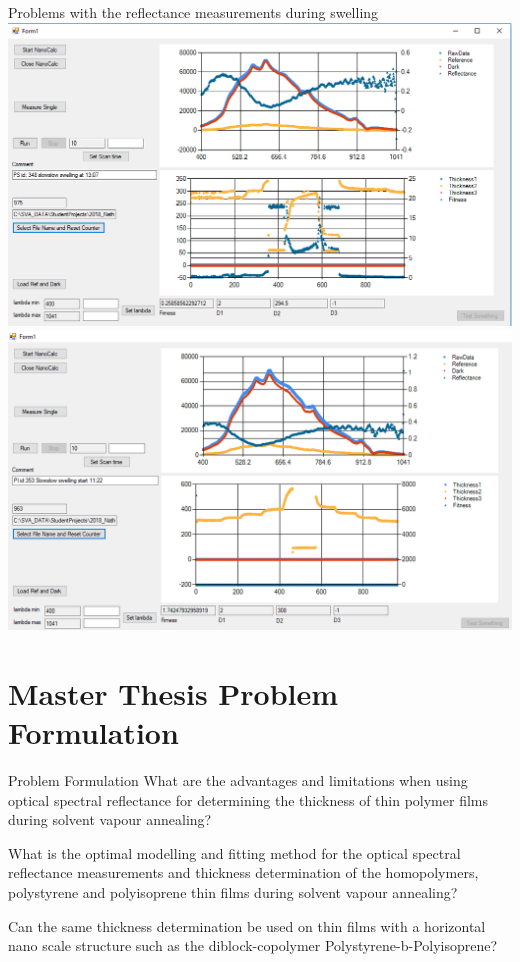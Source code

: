 \documentclass[10pt]{beamer}
\begin{document}
\begin{frame}{Problems with the reflectance measurements during swelling}
	\centering
	\includegraphics[height=0.35\textheight]{badmeasure2.png}
	\includegraphics[height=0.35\textheight]{badmeasure3.png}
\end{frame}


	\section{Master Thesis Problem Formulation}


\begin{frame}{Problem Formulation}
What are the advantages and limitations when using optical spectral reflectance for determining the thickness of thin polymer films during solvent vapour annealing?

What is the optimal modelling and fitting method for the optical spectral reflectance measurements and thickness determination of the homopolymers, polystyrene and polyisoprene thin films during solvent vapour annealing?  
		
Can the same thickness determination be used on thin films with a horizontal nano scale structure such as the diblock-copolymer Polystyrene-b-Polyisoprene? 
\end{frame}
	
\end{document}
